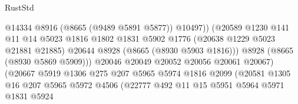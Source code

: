 \begin{lexlean}{RustStd}
\begin{coremodule}
                                              @14334
                                              @8916
                                              (@8665 (@9489 @5891 @5877))
                                              @10497))
                                          (@20589
                                            @1230
                                            @141
                                            @11
                                            @14
                                            @5023
                                            @1816
                                            @1802
                                            @1831
                                            @5902
                                            @1776
                                            (@20638 @1229 @5023 @21881 @21885)
                                            @20644
                                            @8928
                                            (@8665 (@8930 @5903 @1816)))
                                          @8928
                                          (@8665 (@8930 @5869 @5909)))
                                        @20046
                                        @20049
                                        @20052
                                        @20056
                                        @20061
                                        @20067)
                                      (@20667
                                        @5919
                                        @1306
                                        @275
                                        @207
                                        @5965
                                        @5974
                                        @1816
                                        @2099
                                        (@20581
                                          @1305
                                          @16
                                          @207
                                          @5965
                                          @5972
                                          @4506
                                          (@22777
                                            @492
                                            @11
                                            @15
                                            @5951
                                            @5964
                                            @5971
                                            @1831
                                            @5924

\end{coremodule}
\end{lexlean}
